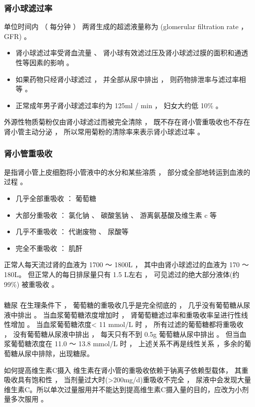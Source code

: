 \documentclass[dvipsnames, svgnames, x11names]{beamer}
\begin{document}
\begin{frame}
    \frametitle{肾小球滤过率}
    单位时间内 （ 每分钟 ） 两肾生成的超滤液量称为 (glomerular filtration rate ，GFR) 。 
    \begin{itemize}
      \item 肾小球滤过率受肾血流量 、 肾小球有效滤过压及肾小球滤过膜的面积和通透性等因素的影响 。 
      \item 如果药物只经肾小球滤过 ， 并全部从尿中排出 ， 则药物排泄率与滤过率相等 。
      \item 正常成年男子肾小球滤过率约为 125ml / min ， 妇女大约低 10\% 。
    \end{itemize}
    \begin{blankblock}{}
        外源性物质菊粉仅由肾小球滤过而被完全清除 ， 既不存在肾小管重吸收也不存在肾小管主动分泌 ， 所以常用菊粉的清除率来表示肾小球滤过率 。 
    \end{blankblock}
\end{frame}


\begin{frame}
    \frametitle{肾小管重吸收}
    是指肾小管上皮细胞将小管液中的水分和某些溶质 ， 部分或全部地转运到血液的过程 。
    \begin{itemize}
      \item 几乎全部重吸收 ： 葡萄糖
      \item 大部分重吸收 ： 氯化钠 、 碳酸氢钠 、 游离氨基酸及维生素 c 等
      \item 几乎不重吸收 ： 代谢废物 、 尿酸等
      \item 完全不重吸收 ： 肌酐 %
    \end{itemize}
    \begin{blankblock}{}
        正常人每天流过肾的血液为 1700 ～ 1800L ， 其中由肾小球滤过的血液为 170 ～ 180L。 但正常人的每日排尿量只有 1.5 L左右 ， 可见滤过的绝大部分液体(约 99\%) 被重吸收 。
    \end{blankblock}
\end{frame}


\begin{frame}
    \frametitle{}
    \begin{block}{糖尿}
        在生理条件下 ， 葡萄糖的重吸收几乎是完全彻底的 ， 几乎没有葡萄糖从尿液中排出 。 当血浆葡萄糖浓度增加时 ， 肾葡萄糖滤过率和重吸收率呈进行性线性增加 。 当血浆葡萄糖浓度< 11 mmol/L 时 ， 所有过滤的葡萄糖都将重吸收 ， 没有葡萄糖从尿液中排出 ， 每天只有不到 0.5g 葡萄糖从尿中排出 。 但当血浆葡萄糖浓度在 11.0 ～ 13.8 mmol/L 时 ， 上述关系不再是线性关系 ，多余的葡萄糖从尿中排除，出现糖尿。
    \end{block}
    \begin{block}{如何提高维生素C摄入}
        维生素在肾小管的重吸收依赖于钠离子依赖型载体， 其重吸收具有饱和性 ， 当剂量过大时(>200mg/d)重吸收不完全 ， 尿液中会发现大量维生素C。所以单次过量服用并不能达到提高维生素C摄入量的目的，应改为小剂量多次服用 。
    \end{block}
\end{frame}
\end{document}
